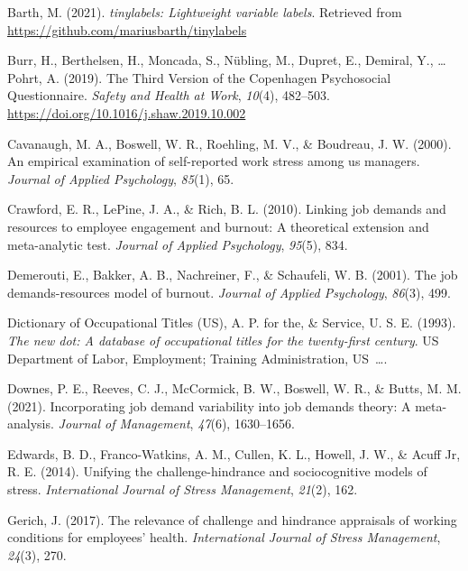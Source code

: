 \documentclass[
  english,
  man]{apa6}
\begin{document}
\leavevmode\hypertarget{ref-R-tinylabels}{}%
Barth, M. (2021). \emph{tinylabels: Lightweight variable labels}. Retrieved from \url{https://github.com/mariusbarth/tinylabels}

\leavevmode\hypertarget{ref-burr_third_2019}{}%
Burr, H., Berthelsen, H., Moncada, S., Nübling, M., Dupret, E., Demiral, Y., \ldots{} Pohrt, A. (2019). The Third Version of the Copenhagen Psychosocial Questionnaire. \emph{Safety and Health at Work}, \emph{10}(4), 482--503. \url{https://doi.org/10.1016/j.shaw.2019.10.002}

\leavevmode\hypertarget{ref-cavanaugh2000empirical}{}%
Cavanaugh, M. A., Boswell, W. R., Roehling, M. V., \& Boudreau, J. W. (2000). An empirical examination of self-reported work stress among us managers. \emph{Journal of Applied Psychology}, \emph{85}(1), 65.

\leavevmode\hypertarget{ref-crawford2010linking}{}%
Crawford, E. R., LePine, J. A., \& Rich, B. L. (2010). Linking job demands and resources to employee engagement and burnout: A theoretical extension and meta-analytic test. \emph{Journal of Applied Psychology}, \emph{95}(5), 834.

\leavevmode\hypertarget{ref-demerouti2001job}{}%
Demerouti, E., Bakker, A. B., Nachreiner, F., \& Schaufeli, W. B. (2001). The job demands-resources model of burnout. \emph{Journal of Applied Psychology}, \emph{86}(3), 499.

\leavevmode\hypertarget{ref-advisory1993new}{}%
Dictionary of Occupational Titles (US), A. P. for the, \& Service, U. S. E. (1993). \emph{The new dot: A database of occupational titles for the twenty-first century}. US Department of Labor, Employment; Training Administration, US~\ldots.

\leavevmode\hypertarget{ref-downes2021incorporating}{}%
Downes, P. E., Reeves, C. J., McCormick, B. W., Boswell, W. R., \& Butts, M. M. (2021). Incorporating job demand variability into job demands theory: A meta-analysis. \emph{Journal of Management}, \emph{47}(6), 1630--1656.

\leavevmode\hypertarget{ref-edwards2014unifying}{}%
Edwards, B. D., Franco-Watkins, A. M., Cullen, K. L., Howell, J. W., \& Acuff Jr, R. E. (2014). Unifying the challenge-hindrance and sociocognitive models of stress. \emph{International Journal of Stress Management}, \emph{21}(2), 162.

\leavevmode\hypertarget{ref-gerich2017relevance}{}%
Gerich, J. (2017). The relevance of challenge and hindrance appraisals of working conditions for employees' health. \emph{International Journal of Stress Management}, \emph{24}(3), 270.
\end{document}
